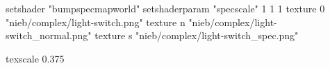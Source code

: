 setshader "bumpspecmapworld"
setshaderparam "specscale" 1 1 1
   texture 0 "nieb/complex/light-switch.png"
   texture n "nieb/complex/light-switch_normal.png"
   texture s "nieb/complex/light-switch_spec.png"

texscale 0.375